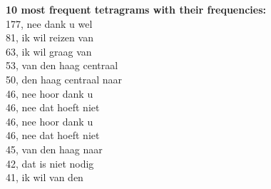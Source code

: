 \documentclass[a4paper,11pt]{article}
\begin{document}
\noindent \textbf{10 most frequent tetragrams with their frequencies: }\\
177, nee dank u wel\\
81, ik wil reizen van\\
63, ik wil graag van\\
53, van den haag centraal\\
50, den haag centraal naar\\
46, nee hoor dank u\\
46, nee dat hoeft niet\\
46, nee hoor dank u\\
46, nee dat hoeft niet\\
45, van den haag naar\\
42, dat is niet nodig\\
41, ik wil van den\\
\end{document}

